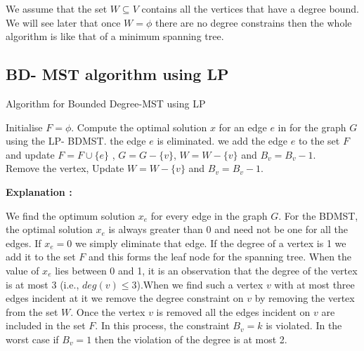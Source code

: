 \documentclass[12pt]{article}
\theoremstyle{plain}
\begin{document}
We assume that the set $W \subseteq V$ contains all the vertices that have a degree bound. We will see later that once $W=\phi$ there are no degree constrains then the whole algorithm is like that of a minimum spanning tree. 

\subsection*{BD- MST algorithm using LP }

\begin{minipage}{1.\linewidth}
\begin{algorithm2e}[H]
\caption{Algorithm for Bounded Degree-MST using LP}
\label{alg:BDMST-LP}

Initialise $F= \phi$.\; \vspace{.1cm}
{
 Compute the optimal solution $x$ for an edge $e$ in for the graph $G$ using the LP- BDMST.\; \vspace{.1cm}
{ the edge $e$ is eliminated.}
{
 we add the edge $e$ to the set $F$ and update $F= F  \cup \{e\}$ ,
  $G=G- \{ v\}$, $W=W- \{ v\}$ and $B_v=B_v -1$.\\
}
{
Remove the vertex,
Update $W=W- \{ v\}$ and $B_v=B_v -1$.
}
}

\end{algorithm2e}
\end{minipage}

\textbf{Explanation :}

We find the optimum solution $x_e$ for every edge in the graph $G$. For the BDMST, the optimal solution $x_e$ is always greater than 0 and need not be one for all the edges. If $x_e= 0$ we simply eliminate that edge. If the degree of a vertex is 1 we add it to the set $F$ and this forms the leaf node for the spanning tree. When the value of $x_e$ lies between 0 and 1, it is an observation that the degree of the vertex is at most 3 (i.e., $deg(v) \leq 3$).When we find such a vertex $v$ with at most three edges incident at it we remove the degree constraint on $v$ by removing the vertex from the set $W$. Once the vertex $v$ is removed all the edges incident on $v$ are included in the set $F$. In this process, the constraint $B_v = k$ is violated.  In the worst case if $B_v =1$ then the violation of the degree is at most 2.
\end{document}
